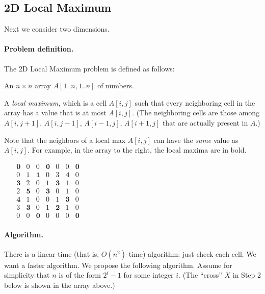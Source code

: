 \subsection{2D Local Maximum}\label{dc: sec: 2D local max}

Next we consider two dimensions.

\paragraph{Problem definition.}
The 2D Local Maximum problem is defined as follows:

\begin{mylist}

\item[\textbf{input:}] An $n\times n$ array $A[1..n, 1..n]$ of numbers.  %

\item[\textbf{output:}]
A \emph{local maximum}, which is a cell $A[i,j]$ such that every neighboring cell in the array has a value that is at most $A[i,j]$.  (The neighboring cells are those among $A[i, j+1]$, $A[i, j-1]$, $A[i-1, j]$, $A[i+1, j]$ that are actually present in $A$.) 

\parbox{4in}{
Note that the neighbors of a local max $A[i,j]$ can have the \emph{same} value as $A[i,j]$.
For example, in the array to the right, the local maxima are in bold.}
~~{\footnotesize
\(
\begin{array}{ccc|c|ccc}
  \mathbf 0 & 0 & 0 & \mathbf 0 & 0 & 0 & \mathbf 0 \\
  0 & 1 & \mathbf 1 & 0 & 3 & \mathbf 4 & 0 \\
  \mathbf 3 & 2 & 0 & 1 & \mathbf 3 & 1 & 0\\ \hline
  2 & \mathbf 5 & 0 & \mathbf 3 & 0 & 1 & 0\\ \hline
  \mathbf 4 & 1 & 0 & 0 & 1 & \mathbf 3 & 0\\
  3 & \mathbf 3 & 0 & 1 & \mathbf 2 & 1 & 0 \\
  0 & 0 & \mathbf 0 & 0 & 0 & 0 & \mathbf 0
\end{array}
\)}
\end{mylist}

\paragraph{Algorithm.}
There is a linear-time (that is, $O(n^2)$-time) algorithm: just check each cell.
We want a faster algorithm.
We propose the following algorithm.
Assume for simplicity that $n$ is of the form $2^i-1$ for some integer $i$. 
(The ``cross'' $X$ in Step 2 below is shown in the array above.)

